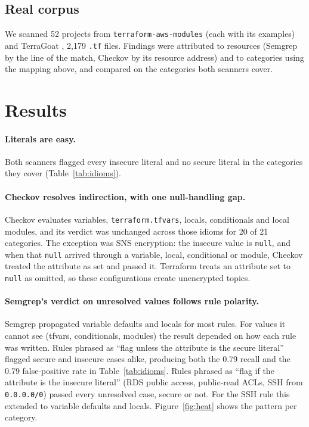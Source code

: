 \documentclass[11pt]{article}
\begin{document}
\subsection{Real corpus}
We scanned 52 projects from \texttt{terraform-aws-modules} (each with its examples) and TerraGoat \cite{terragoat}, 2{,}179
\texttt{.tf} files. Findings were attributed to resources (Semgrep by the line of the match, Checkov by its resource address) and to
categories using the mapping above, and compared on the categories both scanners cover.

\section{Results}


\paragraph{Literals are easy.} Both scanners flagged every insecure literal and no secure literal in the categories they cover
(Table~\ref{tab:idioms}).

\paragraph{Checkov resolves indirection, with one null-handling gap.} Checkov evaluates variables, \texttt{terraform.tfvars},
locals, conditionals and local modules, and its verdict was unchanged across those idioms for 20 of 21 categories. The exception was
SNS encryption: the insecure value is \texttt{null}, and when that \texttt{null} arrived through a variable, local, conditional or module,
Checkov treated the attribute as set and passed it. Terraform treats an attribute set to \texttt{null} as omitted, so these
configurations create unencrypted topics.

\paragraph{Semgrep's verdict on unresolved values follows rule polarity.} Semgrep propagated variable defaults and locals for most
rules. For values it cannot see (tfvars, conditionals, modules) the result depended on how each rule was written. Rules phrased as
``flag unless the attribute is the secure literal'' flagged secure and insecure cases alike, producing both the 0.79 recall and the
0.79 false-positive rate in Table~\ref{tab:idioms}. Rules phrased as ``flag if the attribute is the insecure literal'' (RDS public
access, public-read ACLs, SSH from \texttt{0.0.0.0/0}) passed every unresolved case, secure or not. For the SSH rule this extended to
variable defaults and locals. Figure~\ref{fig:heat} shows the pattern per category.
\end{document}
